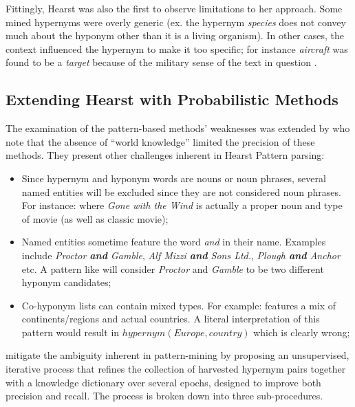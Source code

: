 Fittingly, Hearst was also the first to observe limitations to her approach.  Some mined hypernyms were overly generic (ex. the hypernym \textit{species} does not convey much about the hyponym other than it is a living organism).  In other cases, the context influenced the hypernym to make it too specific; for instance \textit{aircraft} was found to be a \textit{target} because of the military sense of the text in question \citep{hearst1992automatic}.

\subsection{Extending Hearst with Probabilistic Methods}
The examination of the pattern-based methods' weaknesses was extended by \citet{Wang2017} who note that the absence of ``world knowledge'' limited the precision of these methods.   They present other challenges inherent in Hearst Pattern parsing:
\begin{itemize}
    \item Since hypernym and hyponym words are nouns or noun phrases, several named entities will be excluded since they are not considered noun phrases.  For instance:  where \textit{Gone with the Wind} is actually a proper noun and type of movie (as well as classic movie);
    \item Named entities sometime feature the word \textit{and} in their name.  Examples include \textit{Proctor \textbf{and} Gamble}, \textit{Alf Mizzi \textbf{and} Sons Ltd.}, \textit{Plough \textbf{and} Anchor} etc. A pattern like  will consider \textit{Proctor} and \textit{Gamble} to be two different hyponym candidates;
    \item Co-hyponym lists can contain mixed types.  For example:  features a mix of continents/regions and actual countries.  A literal interpretation of this pattern would result in \(hypernym(Europe, country)\) which is clearly wrong;
\end{itemize}

\citet{Wang2017} mitigate the ambiguity inherent in pattern-mining by proposing an unsupervised, iterative process that refines the collection of harvested hypernym pairs together with a knowledge dictionary over several epochs, designed to improve both precision and recall.  The process is broken down into three sub-procedures.  

